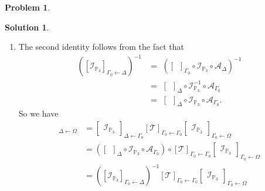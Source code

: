 \documentclass{book}
\theoremstyle{definition}
\newtheorem*{prob*}{Problem}
\newtheorem*{sln*}{Solution}
\newcommand{\T}{\mathcal{T}}
\begin{document}
\begin{prob*}
\begin{sln*}
\begin{enumerate}
\begin{enumerate}
				\item The second identity follows from the fact that
				\begin{align*}
				\left([\mathcal{I}_{\mathbb{P}_3}]_{\Gamma_0\leftarrow\Delta}\right)^{-1}
				&=\,\,
				\left([\,\,\,]_{\Gamma_0}\circ \mathcal{I}_{\mathbb{P}_3} \circ \mathcal{A}_{\Delta}\right)^{-1}\\
				&=\,\,
				[\,\,\,]_\Delta \circ \mathcal{I}^{-1}_{\mathbb{P}_3} \circ \mathcal{A}_{\Gamma_0}\\
				&=\,\,
				[\,\,\,]_\Delta \circ \mathcal{I}_{\mathbb{P}_3} \circ \mathcal{A}_{\Gamma_0}.
				\end{align*}
				So we have
				\begin{align*}
				[\T]_{\Delta\leftarrow\Omega} &=
				\begin{bmatrix}
				\mathcal{I}_{\mathbb{P}_3}
				\end{bmatrix}_{\Delta \leftarrow \Gamma_0} [\mathcal{T}]_{\Gamma_0 \leftarrow \Gamma_0} 
				\begin{bmatrix}
				\mathcal{I}_{\mathbb{P}_3}
				\end{bmatrix}_{\Gamma_0 \leftarrow \Omega}\\
				&= \left([\,\,\,]_{\Delta}\circ\mathcal{I}_{\mathbb{P}_3} \circ \mathcal{A}_{\Gamma_0}\right)\circ[\mathcal{T}]_{\Gamma_0 \leftarrow \Gamma_0} 
				\begin{bmatrix}
				\mathcal{I}_{\mathbb{P}_3}
				\end{bmatrix}_{\Gamma_0 \leftarrow \Omega}\\ &= \left([\mathcal{I}_{\mathbb{P}_3}]_{\Gamma_0\leftarrow\Delta}\right)^{-1}[\mathcal{T}]_{\Gamma_0 \leftarrow \Gamma_0} 
				\begin{bmatrix}
				\mathcal{I}_{\mathbb{P}_3}
				\end{bmatrix}_{\Gamma_0 \leftarrow \Omega}
				\end{align*}
			\end{enumerate}
		
			
			
			
			
			
			
			
			

\end{enumerate}
\end{sln*}
\end{prob*}
\end{document}
